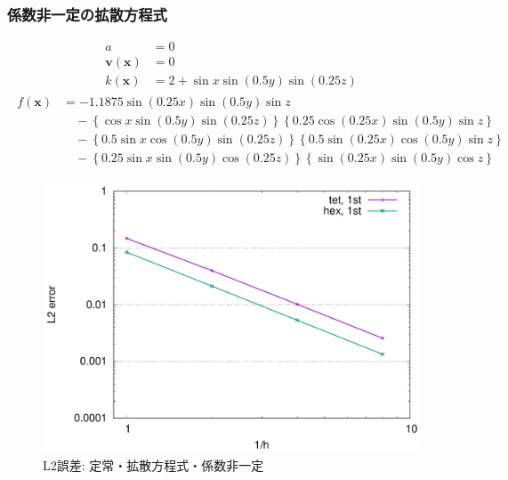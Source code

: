 \documentclass[8pt,a4paper]{article}
\newcommand{\bsm}{\boldsymbol}
\begin{document}
\subsubsection{係数非一定の拡散方程式}
\begin{align}
	a &= 0 \\
	\bsm{v} (\bsm{x}) &= 0 \\
	k (\bsm{x}) &= 2 + \sin x \sin \left( 0.5 y \right) \sin \left( 0.25 z \right)
\end{align}
\begin{align}
	\begin{split}
	f (\bsm{x}) &=  -1.1875 \sin \left( 0.25 x \right) \sin \left( 0.5 y \right) \sin z \\
		& \quad - \left\{     \cos x \sin \left( 0.5 y \right) \sin \left( 0.25 z \right) \right\} \left\{ 0.25 \cos \left( 0.25 x \right) \sin \left( 0.5 y \right) \sin z \right\} \\
		& \quad - \left\{0.5  \sin x \cos \left( 0.5 y \right) \sin \left( 0.25 z \right) \right\} \left\{ 0.5  \sin \left( 0.25 x \right) \cos \left( 0.5 y \right) \sin z \right\} \\
		& \quad - \left\{0.25 \sin x \sin \left( 0.5 y \right) \cos \left( 0.25 z \right) \right\} \left\{      \sin \left( 0.25 x \right) \sin \left( 0.5 y \right) \cos z \right\} 
	\end{split}
\end{align}
\begin{figure}[h!!]
	\centering
	\includegraphics[width=10.0truecm]{pics/conv_diff_nonconst.pdf}
	\caption{L2誤差: 定常・拡散方程式・係数非一定}
	\label{fig:conv_diff_nonconst}
\end{figure}
\end{document}
